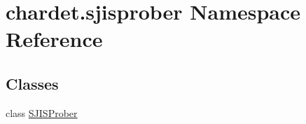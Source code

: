 \hypertarget{namespacechardet_1_1sjisprober}{}\section{chardet.\+sjisprober Namespace Reference}
\label{namespacechardet_1_1sjisprober}
\subsection*{Classes}
\begin{DoxyCompactItemize}
\item 
class \hyperlink{classchardet_1_1sjisprober_1_1_s_j_i_s_prober}{S\+J\+I\+S\+Prober}
\end{DoxyCompactItemize}
